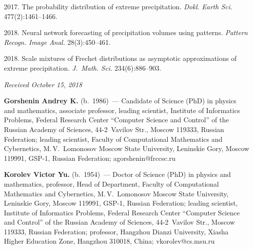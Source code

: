\begin{multicols}{2}
{{\begin{thebibliography}{99}
 2017. 
The probability distribution of extreme precipitation. \textit{Dokl. Earth Sci.} 
477(2):1461--1466.

 2018. Neural network forecasting of precipitation volumes using patterns. 
 \textit{Pattern Recogn. Image Anal.} 28(3):450--461.

 2018. Scale mixtures of
Frechet distributions as asymptotic approximations of extreme precipitation. 
\textit{J.~Math. Sci.} 234(6):886--903.
\end{thebibliography}

 }
 }

\end{multicols}

\vspace*{-6pt}

\hfill{\small\textit{Received October 15, 2018}}





\Contr

\noindent
\textbf{Gorshenin Andrey K.} (b.\ 1986)~--- Candidate of Science (PhD) in physics and
mathematics, associate professor, leading scientist, Institute of Informatics Problems,
Federal Research Center ``Computer Science and Control'' of the Russian Academy of
Sciences, 44-2~Vavilov Str., Moscow 119333, Russian Federation;  leading scientist, 
Faculty
of Computational Mathematics and Cybernetics, M.\,V.~Lomonosov Moscow State University, 
 Leninskie Gory,  Moscow 119991,  GSP-1, Russian Federation; \mbox{agorshenin@frccsc.ru}

\vspace*{3pt}

\noindent
\textbf{Korolev Victor Yu.} (b.\ 1954)~--- Doctor of Science (PhD) in physics and
mathematics, professor, Head of Department, 
Faculty of Computational Mathematics and Cybernetics, 
M.\,V.~Lomonosov Moscow State University,  Leninskie Gory,  Moscow 119991,  GSP-1,
Russian Federation; leading scientist, Institute of Informatics Problems, 
Federal Research Center ``Computer Science and Control'' of the 
Russian Academy of Sciences, 44-2~Vavilov Str., Moscow 119333, Russian Federation; 
professor, Hangzhou Dianzi University, Xiasha Higher Education Zone, Hangzhou 310018, 
China; \mbox{vkorolev@cs.msu.ru}
\label{end\stat}

\renewcommand{\bibname}{\protect\rm Литература}    